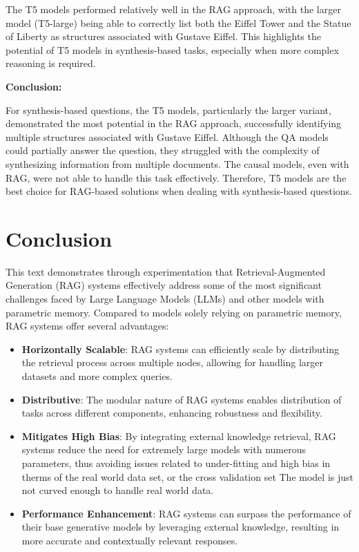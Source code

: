 \documentclass{wseas}
\begin{document}
The T5 models performed relatively well in the RAG approach, with the
larger model (T5-large) being able to correctly list both the Eiffel
Tower and the Statue of Liberty as structures associated with Gustave
Eiffel. This highlights the potential of T5 models in synthesis-based
tasks, especially when more complex reasoning is required.

\textbf{Conclusion:}

For synthesis-based questions, the T5 models, particularly the larger
variant, demonstrated the most potential in the RAG approach,
successfully identifying multiple structures associated with Gustave
Eiffel. Although the QA models could partially answer the question, they
struggled with the complexity of synthesizing information from multiple
documents. The causal models, even with RAG, were not able to handle
this task effectively. Therefore, T5 models are the best choice for
RAG-based solutions when dealing with synthesis-based questions.


\section{Conclusion}

This text demonstrates through experimentation that Retrieval-Augmented
Generation (RAG) systems effectively address some of the most
significant challenges faced by Large Language Models (LLMs) and other
models with parametric memory. Compared to models solely relying on
parametric memory, RAG systems offer several advantages:

\begin{itemize}
\item
  \textbf{Horizontally Scalable}: RAG systems can efficiently scale by
  distributing the retrieval process across multiple nodes, allowing for
  handling larger datasets and more complex queries.
\item
  \textbf{Distributive}: The modular nature of RAG systems enables
  distribution of tasks across different components, enhancing
  robustness and flexibility.
\item
  \textbf{Mitigates High Bias}: By integrating external knowledge
  retrieval, RAG systems reduce the need for extremely large models with
  numerous parameters, thus avoiding issues related to under-fitting and
  high bias in therms of the real world data set, or the cross
  validation set The model is just not curved enough to handle real
  world data.
\item
  \textbf{Performance Enhancement}: RAG systems can surpass the
  performance of their base generative models by leveraging external
  knowledge, resulting in more accurate and contextually relevant
  responses.
\end{itemize}
\end{document}
